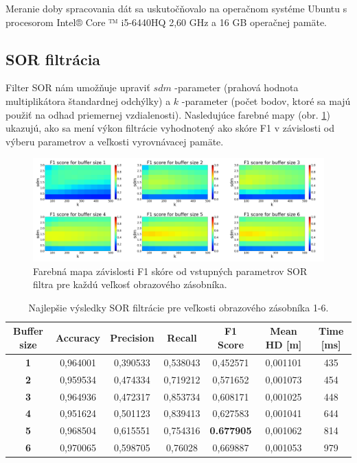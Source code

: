 Meranie doby spracovania dát sa uskutočňovalo na operačnom systéme Ubuntu s procesorom Intel® Core ™ i5-6440HQ 2,60 GHz a 16 GB operačnej pamäte. 

\subsection{SOR filtrácia}

Filter SOR nám umožňuje upraviť $sdm$ -parameter (prahová hodnota multiplikátora štandardnej odchýlky) a $k$ -parameter (počet bodov, ktoré sa majú použiť na odhad priemernej vzdialenosti). Nasledujúce farebné mapy (obr. \ref{fig:sorf1}) ukazujú, ako sa mení výkon filtrácie vyhodnotený ako skóre F1 v závislosti od výberu parametrov a veľkosti vyrovnávacej pamäte.

\begin{figure}[h]
	\centering
	\includegraphics[width=\textwidth]{figures/sor_f1.png}
	\caption{Farebná mapa závislosti F1 skóre od vstupných parametrov SOR filtra pre každú veľkosť obrazového zásobníka.}
	\label{fig:sorf1}
\end{figure}

\begin{table}[h]
	\centering
	\caption{\label{tab:sor_best} Najlepšie výsledky SOR filtrácie pre veľkosti obrazového zásobníka 1-6. }
	\begin{tabular}{ccccccc}
		\toprule
		\textbf{Buffer size} & \textbf{Accuracy} & \textbf{Precision} & \textbf{Recall} & \textbf{F1 Score} & \textbf{Mean HD [m]} & \textbf{Time [ms]} \\ 
		\midrule
		\textbf{1}           & 0,964001          & 0,390533           & 0,538043        & 0,452571          & 0,001101          & 435           \\ 
		\textbf{2}           & 0,959534          & 0,474334           & 0,719212        & 0,571652          & 0,001073          & 454           \\ 
		\textbf{3}           & 0,964936          & 0,472317           & 0,853734        & 0,608171          & 0,001025          & 448           \\ 
		\textbf{4}           & 0,951624          & 0,501123           & 0,839413        & 0,627583          & 0,001041          & 644           \\ 
		\textbf{5}           & 0,968504          & 0,615551           & 0,754316        & \textbf{0.677905}          & 0,001062 & 814           \\ 
		\textbf{6}           & 0,970065          & 0,598705           & 0,76028         & 0,669887          & 0,001053          & 979           \\ 
		\bottomrule
	\end{tabular}
\end{table}

